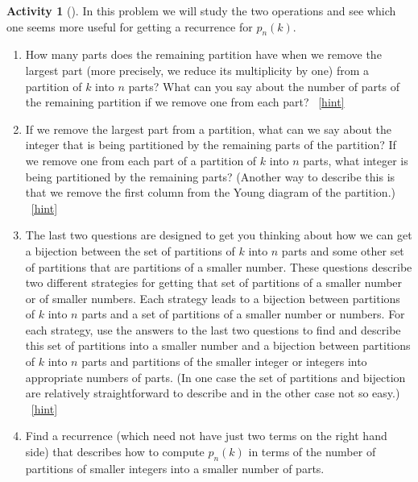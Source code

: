 \documentclass[10pt,]{book}
\theoremstyle{plain}
\theoremstyle{definition}
\theoremstyle{definition}
\theoremstyle{definition}
\newtheorem{activity}[project]{Activity}
\numberwithin{equation}{chapter}
\begin{document}
\begin{activity}[]\label{numberpartitionrecurrence}
\hypertarget{p-1145}{}%
In this problem we will study the two operations and see which one seems more useful for getting a recurrence for \(p_n(k)\).%
\begin{enumerate}[font=\bfseries,label=(\alph*),ref=\alph*]
\item\label{task-219} \hypertarget{p-1146}{}%
How many parts does the remaining partition have when we remove the largest part (more precisely, we reduce its multiplicity by one) from a partition of \(k\) into \(n\) parts?  What can you say about the number of parts of the remaining partition if we remove one from each part?%
~\hfill{\tiny\hyperlink{a-215.a}{[hint]}\hypertarget{q-215.a}{}}\item\label{task-220} \hypertarget{p-1149}{}%
If we remove the largest part from a partition, what can we say about the integer that is being partitioned by the remaining parts of the partition? If we remove one from each part of a partition of \(k\) into \(n\) parts, what integer is being partitioned by the remaining parts? (Another way to describe this is that we remove the first column from the Young diagram of the partition.)%
~\hfill{\tiny\hyperlink{a-215.b}{[hint]}\hypertarget{q-215.b}{}}\item\label{task-221} \hypertarget{p-1152}{}%
The last two questions are designed to get you thinking about how we can get a bijection between the set of partitions of \(k\) into \(n\) parts and some other set of partitions that are partitions of a smaller number.  These questions describe two different strategies for getting that set of partitions of a smaller number or of smaller numbers.  Each strategy leads to a bijection between partitions of \(k\) into \(n\) parts and a set of partitions of a smaller number or numbers.  For each strategy, use the answers to the last two questions to find and describe this set of partitions into a smaller number and a bijection between partitions of \(k\) into \(n\) parts and partitions of the smaller integer or integers into appropriate numbers of parts. (In one case the set of partitions and bijection are relatively straightforward to describe and in the other case not so easy.)%
~\hfill{\tiny\hyperlink{a-215.c}{[hint]}\hypertarget{q-215.c}{}}\item\label{task-222} \hypertarget{p-1156}{}%
Find a recurrence (which need not have just two terms on the right hand side) that describes how to compute \(p_n(k)\) in terms of the number of partitions of smaller integers into a smaller number of parts.%

\end{enumerate}
\end{activity}
\end{document}
